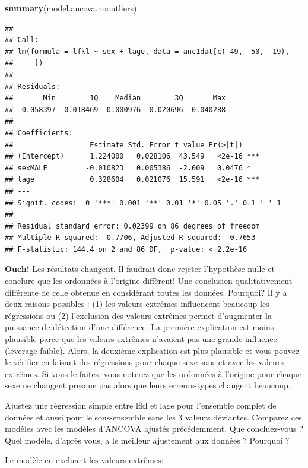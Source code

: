 \documentclass[12pt,]{book}
\makeatletter
\newenvironment{Shaded}{\begin{snugshade}}{\end{snugshade}}
\newcommand{\KeywordTok}[1]{\textcolor[rgb]{0.13,0.29,0.53}{\textbf{#1}}}
\newcommand{\NormalTok}[1]{#1}
\newenvironment{kframe}{%
\medskip{}
\setlength{\fboxsep}{.8em}
\def\at@end@of@kframe{}%
\ifinner\ifhmode%
 \def\at@end@of@kframe{\end{minipage}}%
 \begin{minipage}{\columnwidth}%
\fi\fi%
\def\FrameCommand##1{\hskip\@totalleftmargin \hskip-\fboxsep
\colorbox{incolor}{##1}\hskip-\fboxsep
    \hskip-\linewidth \hskip-\@totalleftmargin \hskip\columnwidth}%
\MakeFramed {\advance\hsize-\width
  \@totalleftmargin\z@ \linewidth\hsize
  \@setminipage}}%
{\par\unskip\endMakeFramed%
\at@end@of@kframe}
\newenvironment{rmdblock}[1]
 {
 \begin{itemize}
 \renewcommand{\labelitemi}{
   \raisebox{-.7\height}[0pt][0pt]{
     {\setkeys{Gin}{width=3em,keepaspectratio}\texttt{[image: images/\#1]}}
   }
 }
 \begin{kframe}
 \setlength{\fboxsep}{1em}
 \item
 }
 {
 \end{kframe}
 \end{itemize}
 }
\newenvironment{rmdcode}
  {\begin{rmdblock}{screen}}
  {\end{rmdblock}}
\makeatother
\begin{document}
\begin{Shaded}
\begin{Highlighting}[]
\KeywordTok{summary}\NormalTok{(model.ancova.nooutliers)}
\end{Highlighting}
\end{Shaded}

\begin{verbatim}
## 
## Call:
## lm(formula = lfkl ~ sex + lage, data = anc1dat[c(-49, -50, -19), 
##     ])
## 
## Residuals:
##       Min        1Q    Median        3Q       Max 
## -0.058397 -0.018469 -0.000976  0.020696  0.040288 
## 
## Coefficients:
##                  Estimate Std. Error t value Pr(>|t|)    
## (Intercept)      1.224000   0.028106  43.549   <2e-16 ***
## sexMALE         -0.010823   0.005386  -2.009   0.0476 *  
## lage             0.328604   0.021076  15.591   <2e-16 ***
## ---
## Signif. codes:  0 '***' 0.001 '**' 0.01 '*' 0.05 '.' 0.1 ' ' 1
## 
## Residual standard error: 0.02399 on 86 degrees of freedom
## Multiple R-squared:  0.7706, Adjusted R-squared:  0.7653 
## F-statistic: 144.4 on 2 and 86 DF,  p-value: < 2.2e-16
\end{verbatim}

\textbf{Ouch!} Les résultats changent. Il faudrait donc rejeter l'hypothèse nulle et conclure que les ordonnées à l'origine diffèrent! Une conclusion qualitativement différente de celle obtenue en considérant toutes les données. Pourquoi? Il y a deux raisons possibles : (1) les valeurs extrêmes influencent beaucoup les régressions ou (2) l'exclusion des valeurs extrêmes permet d'augmenter la puissance de détection d'une différence. La première explication est moins plausible parce que les valeurs extrêmes n'avaient pas une grande influence (leverage faible). Alors, la deuxième explication est plus plausible et vous pouvez le vérifier en faisant des régressions pour chaque sexe sans et avec les valeurs extrêmes. Si vous le faites, vous noterez que les ordonnées à l'origine pour chaque sexe ne changent presque pas alors que leurs erreurs-types changent beaucoup.

\begin{rmdcode}
Ajustez une régression simple entre lfkl et lage pour l'ensemble complet de données et aussi pour le sous-ensemble sans les 3 valeurs déviantes. Comparez ces modèles avec les modèles d'ANCOVA ajustés précédemment. Que concluez-vous ? Quel modèle, d'après vous, a le meilleur ajustement aux données ? Pourquoi ?
\end{rmdcode}

Le modèle en excluant les valeurs extrêmes:
\end{document}
